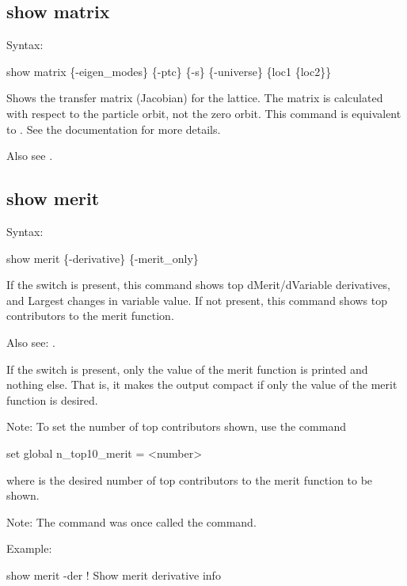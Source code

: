 {{{{{{{{%

\subsection{show matrix}
\label{s:show.matrix}

Syntax:
\begin{example}
  show matrix \{-eigen_modes\} \{-ptc\} \{-s\} \{-universe\} \{loc1 \{loc2\}\}
\end{example}

Shows the transfer matrix (Jacobian) for the  lattice. The matrix is calculated with
respect to the particle orbit, not the zero orbit. This command is equivalent to . See the  documentation for more details.

Also see .


\subsection{show merit}
\label{s:show.merit}

Syntax:
\begin{example}
  show merit \{-derivative\} \{-merit_only\}
\end{example}

If the  switch is present, this command shows top dMerit/dVariable derivatives, and
Largest changes in variable value. If not present, this command shows top contributors to the merit
function.

Also see: .

If the  switch is present, only the value of the merit function is printed and
nothing else. That is, it makes the output compact if only the value of the merit function is
desired.

Note: To set the number of top contributors shown, use the command 
\begin{example}
  set global n_top10_merit = <number>
\end{example}
where  is the desired number of top contributors to the merit function to be shown.

Note: The  command was once called the  command.

Example:
\begin{example}
  show merit -der     ! Show merit derivative info
\end{example}

}}}}}}}}
